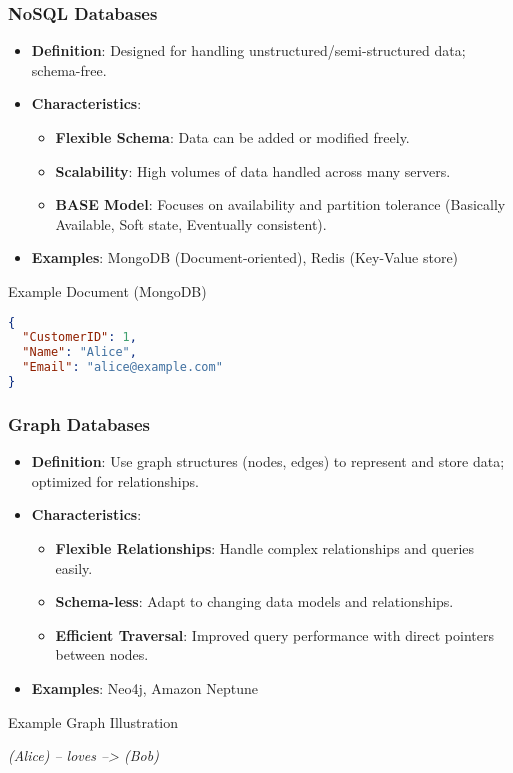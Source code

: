 \documentclass[aspectratio=169]{beamer}
\begin{document}
\begin{frame}[fragile]
    \frametitle{NoSQL Databases}
    \begin{itemize}
        \item \textbf{Definition}: Designed for handling unstructured/semi-structured data; schema-free.
        \item \textbf{Characteristics}:
            \begin{itemize}
                \item \textbf{Flexible Schema}: Data can be added or modified freely.
                \item \textbf{Scalability}: High volumes of data handled across many servers.
                \item \textbf{BASE Model}: Focuses on availability and partition tolerance (Basically Available, Soft state, Eventually consistent).
            \end{itemize}
        \item \textbf{Examples}: MongoDB (Document-oriented), Redis (Key-Value store)
    \end{itemize}
    
    \begin{block}{Example Document (MongoDB)}
    \begin{lstlisting}[language=json]
{
  "CustomerID": 1,
  "Name": "Alice",
  "Email": "alice@example.com"
}
    \end{lstlisting}
    \end{block}
\end{frame}

\begin{frame}[fragile]
    \frametitle{Graph Databases}
    \begin{itemize}
        \item \textbf{Definition}: Use graph structures (nodes, edges) to represent and store data; optimized for relationships.
        \item \textbf{Characteristics}:
            \begin{itemize}
                \item \textbf{Flexible Relationships}: Handle complex relationships and queries easily.
                \item \textbf{Schema-less}: Adapt to changing data models and relationships.
                \item \textbf{Efficient Traversal}: Improved query performance with direct pointers between nodes.
            \end{itemize}
        \item \textbf{Examples}: Neo4j, Amazon Neptune
    \end{itemize}
    
    \begin{block}{Example Graph Illustration}
        \begin{center}
        \textit{(Alice) -- loves --> (Bob)}
        \end{center}
    \end{block}
\end{frame}
\end{document}
